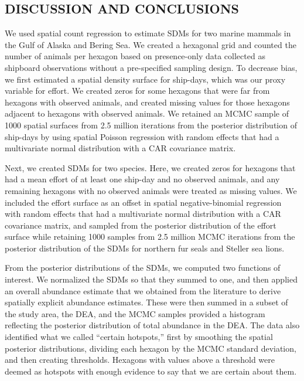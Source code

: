 \documentclass[11pt, titlepage]{article}
\begin{document}
\begin{spacing}{1.9}
\begin{flushleft}
\section{DISCUSSION AND CONCLUSIONS}

We used spatial count regression to estimate SDMs for two marine mammals in the Gulf of Alaska and Bering Sea.  We created a hexagonal grid and counted the number of animals per hexagon based on presence-only data collected as shipboard observations without a pre-specified sampling design. To decrease bias, we first estimated a spatial density surface for ship-days, which was our proxy variable for effort.  We created zeros for some hexagons that were far from hexagons with observed animals, and created missing values for those hexagons adjacent to hexagons with observed animals.  We retained an MCMC sample of 1000 spatial surfaces from 2.5 million iterations from the posterior distribution of ship-days by using spatial Poisson regression with random effects that had a multivariate normal distribution with a CAR covariance matrix.

Next, we created SDMs for two species. Here, we created zeros for hexagons that had a mean effort of at least one ship-day and no observed animals, and any remaining hexagons with no observed animals were treated as missing values.  We included the effort surface as an offset in spatial negative-binomial regression with random effects that had a multivariate normal distribution with a CAR covariance matrix, and sampled from the posterior distribution of the effort surface while retaining 1000 samples from 2.5 million MCMC iterations from the posterior distribution of the SDMs for northern fur seals and Steller sea lions.

From the posterior distributions of the SDMs, we computed two functions of interest.  We normalized the SDMs so that they summed to one, and then applied an overall abundance estimate that we obtained from the literature to derive spatially explicit abundance estimates.  These were then summed in a subset of the study area, the DEA, and the MCMC samples provided a histogram reflecting the posterior distribution of total abundance in the DEA.  The data also identified what we called ``certain hotspots,'' first by smoothing the spatial posterior distributions, dividing each hexagon by the MCMC standard deviation, and then creating thresholds.  Hexagons with values above a threshold were deemed as hotspots with enough evidence to say that we are certain about them.


\end{flushleft}
\end{spacing}
\end{document}
